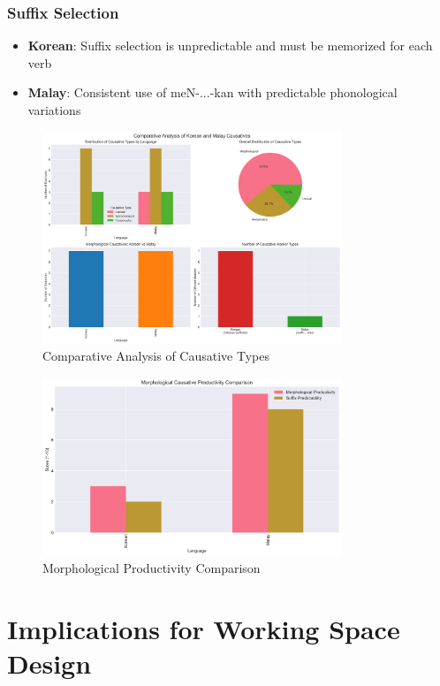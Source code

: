 \documentclass[12pt,a4paper]{article}
\begin{document}
\subsubsection{Suffix Selection}
\begin{itemize}
\item \textbf{Korean}: Suffix selection is unpredictable and must be memorized for each verb
\item \textbf{Malay}: Consistent use of meN-...-kan with predictable phonological variations
\end{itemize}

\begin{figure}[h]
\centering
\includegraphics[width=0.8\textwidth]{../analysis/causative_comparison.png}
\caption{Comparative Analysis of Causative Types}
\end{figure}

\begin{figure}[h]
\centering
\includegraphics[width=0.8\textwidth]{../analysis/productivity_comparison.png}
\caption{Morphological Productivity Comparison}
\end{figure}

\section{Implications for Working Space Design}
\end{document}
